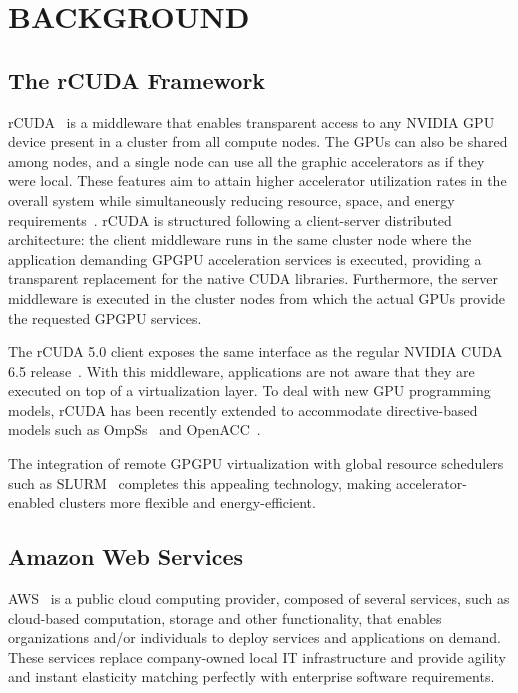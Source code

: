 \documentclass[a4paper,twoside]{article}
\begin{document}
\section{\uppercase{Background}}
\label{sec:background}
\subsection{The rCUDA Framework}
\label{sec:rcuda}
{rCUDA}~\cite{toniparco} is a middleware that enables transparent access
to any NVIDIA GPU device present in a cluster from all compute
nodes. The GPUs can also be shared among nodes, and a single node can use all the graphic accelerators
as if they were local.
These features aim to attain higher accelerator utilization rates in the overall system while simultaneously reducing
resource, space, and energy requirements~\cite{energy14}.
rCUDA is structured following a client-server distributed
architecture: the client middleware runs in the same cluster node where the application demanding GPGPU
acceleration services is executed, providing a transparent replacement for the
native CUDA libraries. Furthermore, the server middleware is executed in the
cluster nodes from which the actual GPUs provide the requested GPGPU services.

The {rCUDA} 5.0 client exposes the same interface as the regular NVIDIA
CUDA 6.5 release~\cite{cuda65}.%
With this middleware, applications are not aware that they are executed
on top of a virtualization layer.
To deal with new GPU programming models, {rCUDA} has been recently extended to accommodate 
directive-based models such as OmpSs~\cite{repara15} and OpenACC~\cite{cluster15}.

The integration of remote GPGPU virtualization with global
resource schedulers such as SLURM~\cite{sbacpad14} completes this appealing 
technology, making accelerator-enabled clusters more flexible and
energy-efficient.

\subsection{Amazon Web Services}
\label{sec:aws}
AWS~\cite{aws} is a public cloud computing provider, 
composed of several services, such as 
 cloud-based computation, storage and other functionality, 
that enables organizations and/or individuals to deploy
services and applications on demand. 
These services replace company-owned local IT infrastructure and provide agility and instant elasticity matching 
perfectly with enterprise software requirements.
\end{document}
